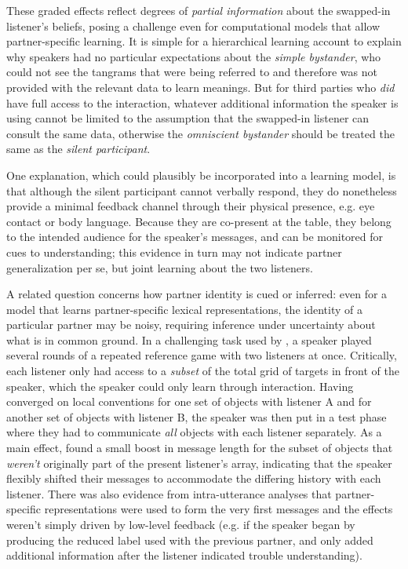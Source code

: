 \documentclass[11pt, floatsintext, jou]{apa6}
\begin{document}
These graded effects reflect degrees of \emph{partial information} about the swapped-in listener's beliefs, posing a challenge even for computational models that allow partner-specific learning. It is simple for a hierarchical learning account to explain why speakers had no particular expectations about the \emph{simple bystander}, who could not see the tangrams that were being referred to and therefore was not provided with the relevant data to learn meanings. But for third parties who \emph{did} have full access to the interaction, whatever additional information the speaker is using cannot be limited to the assumption that the swapped-in listener can consult the same data, otherwise the \emph{omniscient bystander} should be treated the same as the \emph{silent participant}. 

One explanation, which could plausibly be incorporated into a learning model, is that although the silent participant cannot verbally respond, they do nonetheless provide a minimal feedback channel through their physical presence, e.g. eye contact or body language. Because they are co-present at the table, they belong to the intended audience for the speaker's messages, and can be monitored for cues to understanding; this evidence in turn may not indicate partner generalization per se, but joint learning about the two listeners. 

A related question concerns how partner identity is cued or inferred: even for a model that learns partner-specific lexical representations, the identity of a particular partner may be noisy, requiring inference under uncertainty about what is in common ground. In a challenging task used by , a speaker played several rounds of a repeated reference game with two listeners at once. Critically, each listener only had access to a \emph{subset} of the total grid of targets in front of the speaker, which the speaker could only learn through interaction. Having converged on local conventions for one set of objects with listener A and for another set of objects with listener B, the speaker was then put in a test phase where they had to communicate \emph{all} objects with each listener separately. %
As a main effect,  found a small boost in message length for the subset of objects that \emph{weren't} originally part of the present listener's array, indicating that the speaker flexibly shifted their messages to accommodate the differing history with each listener. There was also evidence from intra-utterance analyses that partner-specific representations were used to form the very first messages and the effects weren't simply driven by low-level feedback (e.g. if the speaker began by producing the reduced label used with the previous partner, and only added additional information after the listener indicated trouble understanding). 
\end{document}
